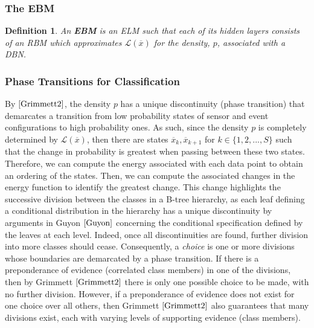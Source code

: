 \documentclass[11pt]{imsart}
\newtheorem{definition}[theorem]{Definition}
\begin{document}
\subsubsection{The EBM}

\begin{definition}
An \textbf{EBM} is an ELM such that each of its hidden layers consists of an RBM which approximates $\mathcal{L}(\overline{x})$ for the density, $p$, associated with a DBN.
\end{definition}

\subsubsection{Phase Transitions for Classification}

By $\cite[Theorem\ (1.11)]{Grimmett2}$, the density $p$ has a unique discontinuity (phase transition) that demarcates a transition from low probability states of sensor and event configurations to high probability ones.  As such, since the density $p$ is completely determined by $\mathcal{L}(\overline{x})$, then there are states $\overline{x}_{k},\overline{x}_{k+1}$ for $k \in \{1,2,...,S\}$ such that the change in probability is greatest when passing between these two states.  Therefore, we can compute the energy associated with each data point to obtain an ordering of the states.  Then, we can compute the associated changes in the energy function to identify the greatest change.  This change highlights the successive division between the classes in a B-tree hierarchy, as each leaf defining a conditional distribution in the hierarchy has a unique discontinuity by arguments in Guyon $\cite[Chapter\ (2)]{Guyon}$ concerning the conditional specification defined by the leaves at each level.  Indeed, once all discontinuities are found, further division into more classes should cease.  Consequently, a \textit{choice} is one or more divisions whose boundaries are demarcated by a phase transition.  If there is a preponderance of evidence (correlated class members) in one of the divisions, then by Grimmett $\cite[Theorem\ (1.11)]{Grimmett2}$ there is only one possible choice to be made, with no further division.  However, if a preponderance of evidence does not exist for one choice over all others, then Grimmett $\cite[Theorem\ (1.11)]{Grimmett2}$ also guarantees that many divisions exist, each with varying levels of supporting evidence (class members).
\end{document}
